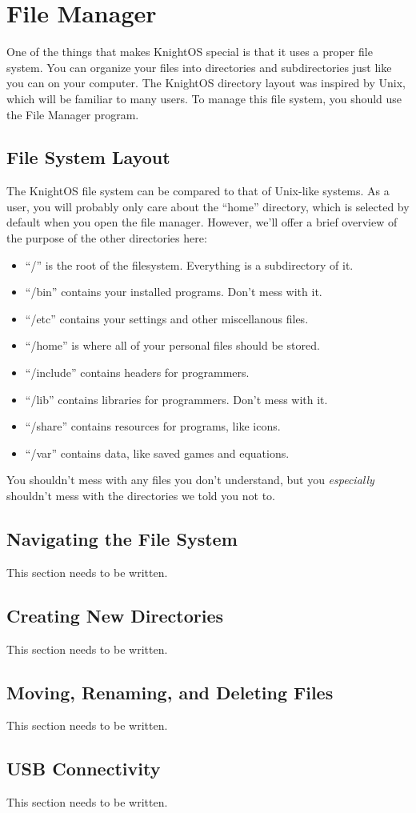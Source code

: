 \chapter{File Manager}

One of the things that makes KnightOS special is that it uses a proper file
system. You can organize your files into directories and subdirectories just like
you can on your computer. The KnightOS directory layout was inspired by Unix,
which will be familiar to many users. To manage this file system, you should use
the File Manager program.

\section{File System Layout}

The KnightOS file system can be compared to that of Unix-like systems. As a user,
you will probably only care about the ``home'' directory, which is selected by
default when you open the file manager. However, we'll offer a brief overview of
the purpose of the other directories here:

\begin{itemize}
    \item ``/'' is the root of the filesystem. Everything is a subdirectory of it.
    \item ``/bin'' contains your installed programs. Don't mess with it.
    \item ``/etc'' contains your settings and other miscellanous files.
    \item ``/home'' is where all of your personal files should be stored.
    \item ``/include'' contains headers for programmers.
    \item ``/lib'' contains libraries for programmers. Don't mess with it.
    \item ``/share'' contains resources for programs, like icons.
    \item ``/var'' contains data, like saved games and equations.
\end{itemize}

You shouldn't mess with any files you don't understand, but you
\textit{especially} shouldn't mess with the directories we told you not to.

\section{Navigating the File System}

This section needs to be written.

\section{Creating New Directories}

This section needs to be written.

\section{Moving, Renaming, and Deleting Files}

This section needs to be written.

\section{USB Connectivity}

This section needs to be written.
